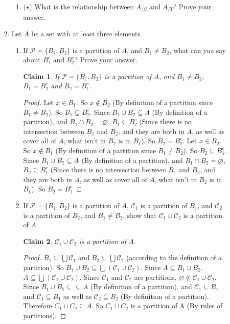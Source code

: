 \documentclass[11pt]{letter}
\newtheorem{claim}{Claim}
\theoremstyle{definition}
\begin{document}
\begin{description}
\begin{enumerate}
\begin{enumerate}
					\item ($\star$) What is the relationship between $A_{/S}$ and $A_{/T}$? Prove your answer.
				\end{enumerate}		
			\item Let $A$ be a set with at least three elements.
				\begin{enumerate}
				\item If $\mathcal{P}=\{B_1,B_2\}$ is a partition of $A$, and $B_1\neq B_2$, what can you say about $B_1^c$ and $B_2^c$? Prove your answer.
                                  \begin{claim}
                                    If $\mathcal{P}=\{B_1,B_2\}$ is a partition of $A$, and $B_1\neq B_2$, $B_1= B_2^c$ and $B_2=B_1^c$.
                                  \end{claim}
                                  \begin{proof}
                                    Let $x\in B_1$. So $x\notin B_2$ (By definition of a partition since $B_1\neq B_2$). So $B_1\subseteq B_2^c$. Since $B_1\cup B_2\subseteq A$ (By definition of a partition), and $B_1\cap B_2=\varnothing$, $B_1\subseteq B_2^c$ (Since there is no intersection between $B_1$ and $B_2$, and they are both in $A$, as well as cover all of $A$, what isn't in $B_2$ is in $B_1$). So $B_2=B_1^c$.
                                    Let $x\in B_2$. So $x\notin B_1$ (By definition of a partition since $B_1\neq B_2$). So $B_2\subseteq B_1^c$. Since $B_1\cup B_2\subseteq A$ (By definition of a partition), and $B_1\cap B_2=\varnothing$, $B_2\subseteq B_1^c$ (Since there is no intersection between $B_1$ and $B_2$, and they are both in $A$, as well as cover all of $A$, what isn't in $B_2$ is in $B_1$). So $B_2=B_1^c$
                                  \end{proof}
				\item If $\mathcal{P}=\{B_1,B_2\}$ is a partition of $A$, $\mathcal{C}_1$ is a partition of $B_1$, and $\mathcal{C}_2$ is a partition of $B_2$, and $B_1\neq B_2$, show that $\mathcal{C}_1\cup\mathcal{C}_2$ is a partition of $A$.
                                  \begin{claim}
                                    $\mathcal{C}_1\cup\mathcal{C}_2$ is a partition of $A$.
                                  \end{claim}
                                  \begin{proof}
                                    $B_1\subseteq \bigcup \mathcal{C}_1$ and $B_2\subseteq \bigcup \mathcal{C}_2$ (according to the definition of a partition). So $B_1\cup B_2\subseteq \bigcup(\mathcal{C}_1\cup \mathcal{C}_2)$. Since $A\subseteq B_1\cup B_2$, $A\subseteq \bigcup(\mathcal{C}_1\cup \mathcal{C}_2)$. Since $\mathcal{C}_1$ and $\mathcal{C}_2$ are partitions, $\varnothing\notin\mathcal{C}_1\cup\mathcal{C}_2$. Since $B_1\cup B_2\subseteq \subseteq A$ (By definition of a partition), and $\mathcal{C}_1\subseteq B_1$ and $\mathcal{C}_1\subseteq B_1$ as well as $\mathcal{C}_2\subseteq B_2$ (By definition of a partition). Therefore $C_1\cup C_2\subseteq A$. So $C_1\cup C_2$ is a partition of A (By rules of partitions).

\end{proof}
\end{enumerate}
\end{enumerate}
\end{description}
\end{document}
